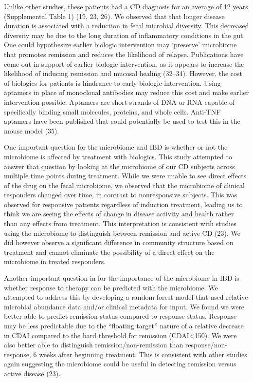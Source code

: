 \documentclass[11pt,]{article}
\begin{document}
Unlike other studies, these patients had a CD diagnosis for an average
of 12 years (Supplemental Table 1) (19, 23, 26). We observed that that
longer disease duration is associated with a reduction in fecal
microbial diversity. This decreased diversity may be due to the long
duration of inflammatory conditions in the gut. One could hypothesize
earlier biologic intervention may `preserve' microbiome that promotes
remission and reduces the likelihood of relapse. Publications have come
out in support of earlier biologic intervention, as it appears to
increase the likelihood of inducing remission and mucosal healing
(32--34). However, the cost of biologics for patients is hindrance to
early biologic intervention. Using aptamers in place of monoclonal
antibodies may reduce this cost and make earlier intervention possible.
Aptamers are short strands of DNA or RNA capable of specifically binding
small molecules, proteins, and whole cells. Anti-TNF aptamers have been
published that could potentially be used to test this in the mouse model
(35).

One important question for the microbiome and IBD is whether or not the
microbiome is affected by treatment with biologics. This study attempted
to answer that question by looking at the microbiome of our CD subjects
across multiple time points during treatment. While we were unable to
see direct effects of the drug on the fecal microbiome, we observed that
the microbiome of clinical responders changed over time, in contrast to
nonresponsive subjects. This was observed for responsive patients
regardless of induction treatment, leading us to think we are seeing the
effects of change in disease activity and health rather than any effects
from treatment. This interpretation is consistent with studies using the
microbiome to distinguish between remission and active CD (23). We did
however observe a significant difference in community structure based on
treatment and cannot eliminate the possibility of a direct effect on the
microbiome in treated responders.

Another important question in for the importance of the microbiome in
IBD is whether response to therapy can be predicted with the microbiome.
We attempted to address this by developing a random-forest model that
used relative microbial abundance data and/or clinical metadata for
input. We found we were better able to predict remission status compared
to response status. Response may be less predictable due to the
``floating target'' nature of a relative decrease in CDAI compared to
the hard threshold for remission (CDAI\textless{}150). We were also
better able to distinguish remission/non-remission than
response/non-response, 6 weeks after beginning treatment. This is
consistent with other studies again suggesting the microbiome could be
useful in detecting remission versus active disease (23).
\end{document}
